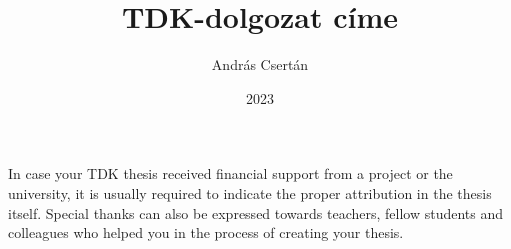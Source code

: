 \documentclass[
]{elteiktdk}[2023/04/10]
\title{TDK-dolgozat címe}
\date{2023}
\author{András Csertán}
\affiliation{}
\begin{document}


\makecover
\cleardoublepage
\maketitle

\tableofcontents
\cleardoublepage


\cleardoublepage


\cleardoublepage


\cleardoublepage


\cleardoublepage

\chapter*{\acklabel}
In case your TDK thesis received financial support from a project or the university, it is usually required to indicate the proper attribution in the thesis itself. Special thanks can also be expressed towards teachers, fellow students and colleagues who helped you in the process of creating your thesis.

\appendix

\cleardoublepage

{}
\printbibliography[title=\biblabel]
\cleardoublepage

{}
\listoffigures
\cleardoublepage

{}
\listoftables
\cleardoublepage

{}
\listofalgorithms
\cleardoublepage

{}
\lstlistoflistings
\cleardoublepage

\end{document}
